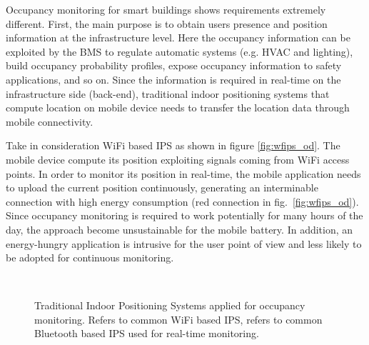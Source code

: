 \smallskip
Occupancy monitoring for smart buildings shows requirements extremely different. First, the main purpose is to obtain users presence and position information at the infrastructure level. Here the occupancy information can be exploited by the BMS to regulate automatic systems (e.g. HVAC and lighting), build occupancy probability profiles, expose occupancy information to safety applications, and so on.
Since the information is required in real-time on the infrastructure side (back-end), traditional indoor positioning systems that compute location on mobile device needs to transfer the location data through mobile connectivity.

Take in consideration WiFi based IPS as shown in figure \ref{fig:wfips_od}. The mobile device compute its position exploiting signals coming from WiFi access points. In order to monitor its position in real-time, the mobile application needs to upload the current position continuously, generating an interminable connection with high energy consumption (red connection in fig.~\ref{fig:wfips_od}). Since occupancy monitoring is required to work potentially for many hours of the day, the approach become unsustainable for the mobile battery. In addition, an energy-hungry application is intrusive for the user point of view and less likely to be adopted for continuous monitoring.



\begin{figure}
     \centering
     \\[-2ex]
     \caption[Traditional Indoor Positioning Systems applied for occupancy monitoring.]{Traditional Indoor Positioning Systems applied for occupancy monitoring. \protect{} Refers to common WiFi based IPS, \protect{} refers to common Bluetooth based IPS used for real-time monitoring.}
	\label{fig:wfips_btips}
\end{figure}



